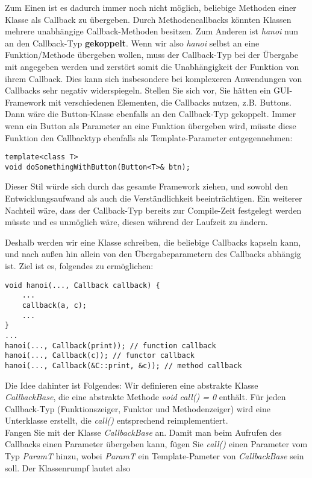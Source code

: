 \documentclass[
  accentcolor=tud1c,	%
  colorbacktitle,		%
  inverttitle,			%
  german,				%
  twoside
]{tudexercise}
\begin{document}
\begin{enumerate}
Zum Einen ist es dadurch immer noch nicht möglich, beliebige Methoden einer Klasse als Callback zu übergeben. Durch Methodencallbacks könnten Klassen mehrere unabhängige Callback-Methoden besitzen. Zum Anderen ist \emph{hanoi} nun an den Callback-Typ \textbf{gekoppelt}. Wenn wir also \emph{hanoi} selbst an eine Funktion/Methode übergeben wollen, muss der Callback-Typ bei der Übergabe mit angegeben werden und zerstört somit die Unabhängigkeit der Funktion von ihrem Callback. Dies kann sich insbesondere bei komplexeren Anwendungen von Callbacks sehr negativ widerspiegeln. Stellen Sie sich vor, Sie hätten ein GUI-Framework mit verschiedenen Elementen, die Callbacks nutzen, z.B. Buttons. Dann wäre die Button-Klasse ebenfalls an den Callback-Typ gekoppelt. Immer\textbf{} wenn ein Button als Parameter an eine Funktion übergeben wird, müsste diese Funktion den Callbacktyp ebenfalls als Template-Parameter entgegennehmen:

\begin{lstlisting}
template<class T>
void doSomethingWithButton(Button<T>& btn);
\end{lstlisting}

Dieser Stil würde sich durch das gesamte Framework ziehen, und sowohl den Entwicklungsaufwand als auch die Verständlichkeit beeinträchtigen. Ein weiterer Nachteil wäre, dass der Callback-Typ bereits zur Compile-Zeit festgelegt werden müsste und es unmöglich wäre, diesen während der Laufzeit zu ändern.

Deshalb werden wir eine Klasse schreiben, die beliebige Callbacks kapseln kann, und nach außen hin allein von den Übergabeparametern des Callbacks abhängig ist. Ziel ist es, folgendes zu ermöglichen:
\begin{lstlisting}
void hanoi(..., Callback callback) {
	...
	callback(a, c);
	...
}
...
hanoi(..., Callback(print)); // function callback
hanoi(..., Callback(c)); // functor callback
hanoi(..., Callback(&C::print, &c)); // method callback
\end{lstlisting} 

Die Idee dahinter ist Folgendes: Wir definieren eine abstrakte Klasse  \emph{CallbackBase}, die eine abstrakte Methode \emph{void call() = 0} enthält. Für jeden Callback-Typ (Funktionszeiger, Funktor und Methodenzeiger) wird eine Unterklasse erstellt, die \emph{call()} entsprechend reimplementiert. \\

Fangen Sie mit der Klasse \emph{CallbackBase} an. Damit man beim Aufrufen des Callbacks einen Parameter übergeben kann, fügen Sie \emph{call()} einen Parameter vom Typ \emph{ParamT} hinzu, wobei \emph{ParamT} ein Template-Pameter von \emph{CallbackBase} sein soll. Der Klassenrumpf lautet also


\end{enumerate}
\end{document}
